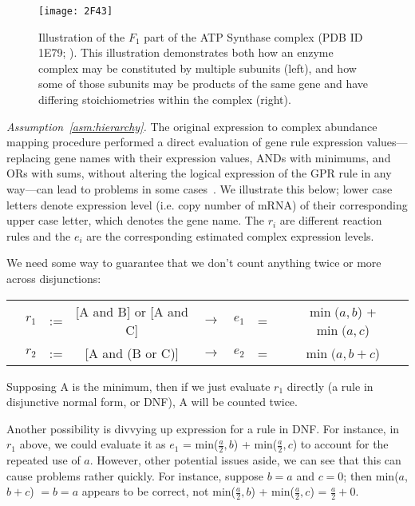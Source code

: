 \begin{figure*}%
\label{fig:2F43}
\centering
\texttt{[image: 2F43]}
\caption{Illustration of the $F_1$ part of the ATP Synthase complex
  (PDB ID 1E79; \citealt{Gibbons2000,Bernstein1978,Gezelter}).
  This illustration demonstrates both how an enzyme complex may be
  constituted by multiple subunits (left), and how some of those
  subunits may be products of the same gene and have differing
  stoichiometries within the complex (right).}
\end{figure*}

\emph{Assumption~\ref{asm:hierarchy}.}
The original expression to complex abundance mapping procedure
performed a direct evaluation of gene rule expression
values---replacing gene names with their expression values, ANDs with
minimums, and ORs with sums, without altering the logical expression
of the GPR rule in any way---can lead to problems in some
cases~\citep{Lee2012}. We illustrate this below; lower case letters
denote expression level (i.e. copy number of mRNA) of their
corresponding upper case letter, which denotes the gene name. The
$r_i$ are different reaction rules and the $e_i$ are the corresponding
estimated complex expression levels.

We need some way to guarantee that we don’t count anything twice or
more across disjunctions: 
\begin{AlgFloat}[H]
{\setlength{\tabcolsep}{.16667em}
\begin{tabular}{cccccccc}
& $r_1$ & := & [A and B] or [A and C] & $\rightarrow$ & $e_1$  &=& $\min(a,b$) + $\min(a,c$) \\ 
& $r_2$ & := & [A and (B or C)]       & $\rightarrow$ & $e_2$  &=&  $\min(a, b + c$) 
\end{tabular} 
}
\end{AlgFloat}

Supposing A is the minimum, then if we just evaluate $r_1$ directly (a
rule in disjunctive normal form, or DNF), A will be counted twice.

Another possibility is divvying up expression for a rule in DNF. For
instance, in $r_1$ above, we could evaluate it as $e_1$ =
min($\frac{a}{2},b$) + min($\frac{a}{2},c$) to account for the
repeated use of $a$. However, other potential issues aside, we can see
that this can cause problems rather quickly. For instance, suppose $b
= a$ and $c = 0$; then min($a$,$b+c$) $=b=a$ appears to be correct,
not min($\frac{a}{2},b$) + min($\frac{a}{2},c$) = $\frac{a}{2} + 0$.

